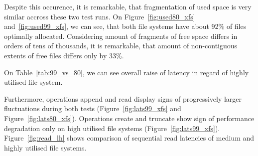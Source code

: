 \documentclass[
  color, %
  table, %
  lof,   %
  lot,   %
]{fithesis3}
\begin{document}
Despite this occurence, it is remarkable, that fragmentation of used space is very similar accross these two test runs. On Figure~\ref{fig:used80_xfs} and~\ref{fig:used99_xfs}, we can see, that both file systems have about 92\% of files optimally allocated. Considering amount of fragments of free space differs in orders of tens of thousands, it is remarkable, that amount of non-contiguous extents of free files differs only by 33\%.

On Table~\ref{tab:99_vs_80}, we can see overall raise of latency in regard of highly utilised file system.

Furthermore, operations append and read display signs of progressively larger fluctuations during both tests (Figure~\ref{fig:lats99_xfs} and Figure~\ref{fig:lats80_xfs}). Operations create and truncate show sign of performance degradation only on high utilised file systems (Figure~\ref{fig:lats99_xfs}). Figure~\ref{fig:read_lh} shows comparison of sequential read latencies of medium and highly utilised file systems.
\end{document}
